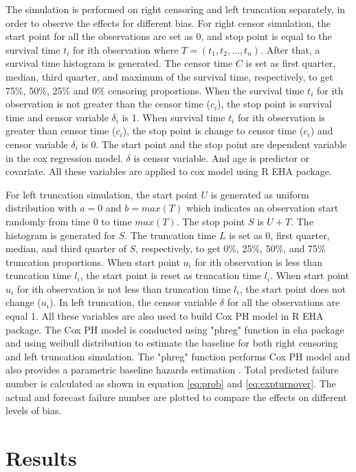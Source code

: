 \documentclass[12pt,letterpaper]{article}
\begin{document}
 The simulation is performed on right censoring and left truncation separately, in order to observe the effects for different bias.
 For right censor simulation, the start point for all the observations are set as 0, and stop point is equal to the survival time $t_i$ for ith observation where $T=(t_1, t_2, \ldots, t_n)$. After that, a survival time histogram is generated. The censor time $C$ is set as first quarter, median, third quarter, and maximum of the survival time, respectively, to get 75\%, 50\%, 25\% and 0\% censoring proportions. When the survival time $t_i$ for ith observation is not greater than the censor time ($c_i$), the stop point is survival time and censor variable $\delta_i$ is 1. When survival time $t_i$ for ith observation is greater than censor time ($c_i$), the stop point is change to censor time ($c_i$) and censor variable $\delta_i$ is  0. The start point and the stop point are dependent variable in the cox regression model. $\delta$ is censor variable. And age is predictor or covariate. All these variables are applied to cox model using R EHA package.

 For left truncation simulation, the start point $U$ is generated as uniform distribution with $a=0$ and $b=max(T)$ which indicates an observation start randomly from time 0 to time $max(T)$. The stop point $S$ is $U+T$. The histogram is generated for $S$. The truncation time $L$ is set as 0, first quarter, median, and third quarter of $S$, respectively, to get 0\%, 25\%, 50\%, and 75\% truncation proportions. When start point $u_i$ for ith observation is less than truncation time $l_i$, the start point is reset as truncation time $l_i$. When start point $u_i$ for ith observation is not less than truncation time $l_i$, the start point does not change ($u_i$). In left truncation, the censor variable $\delta$ for all the observations are equal 1. All these variables are also used to build Cox PH model in R EHA package. The Cox PH model is conducted using "phreg" function in eha package and using weibull distribution to estimate the baseline for both right censoring and left truncation simulation. The "phreg" function performs Cox PH model and also provides a parametric baseline hazards estimation \citep{brostrom2012}. Total predicted failure number is calculated as shown in equation \ref{eq:prob} and \ref {eq:expturnover}. The actual and forecast failure number are plotted to compare the effects on different levels of bias.

\section{Results}
\end{document}
